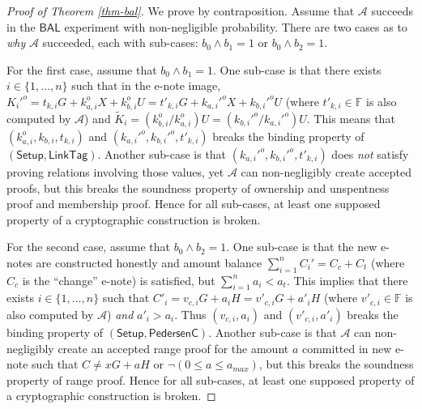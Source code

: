 \documentclass{article}
\begin{document}
\begin{proof}[Proof of Theorem \ref{thm-bal}]
We prove by contraposition. Assume that $\mathcal{A}$ succeeds in the $\textsf{BAL}$ experiment with non-negligible probability. There are two cases as to \textit{why} $\mathcal{A}$ succeeded, each with sub-cases: $b_0 \wedge b_1 = 1$ or $b_0 \wedge b_2 = 1$.

For the first case, assume that $b_0 \wedge b_1 = 1$. One sub-case is that there exists $i\in\{1,\ldots,n\}$ such that in the e-note image, $K_i'^o = t_{k,i} G + k_{a,i}^o X + k_{b,i}^o U = t'_{k,i} G + k_{a,i}'^o X + k_{b,i}'^o U$ (where $t'_{k,i}\in\mathbb{F}$ is also computed by $\mathcal{A}$) and $\tilde{K}_i = (k_{b,i}^o/k_{a,i}^o)U = (k_{b,i}'^o/k_{a,i}'^o)U$. This means that $(k_{a,i}^o, k_{b,i}, t_{k,i})$ and $( k_{a,i}'^o, k_{b,i}'^o, t'_{k,i})$ breaks the binding property of $(\textsf{Setup}, \textsf{LinkTag})$. Another sub-case is that $( k_{a,i}'^o, k_{b,i}'^o, t'_{k,i})$ does \textit{not} satisfy proving relations involving those values, yet $\mathcal{A}$ can non-negligibly create accepted proofs, but this breaks the soundness property of ownership and unspentness proof and membership proof. Hence for all sub-cases, at least one supposed property of a cryptographic construction is broken.

For the second case, assume that $b_0 \wedge b_2 = 1$. One sub-case is that the new e-notes are constructed honestly and amount balance $\sum_{i=1}^n{C_i'}=C_c + C_t$ (where $C_c$ is the ``change'' e-note) is satisfied, but $\sum_{i=1}^n{a_i} < a_t$. This implies that there exists $i\in\{1,\ldots,n\}$ such that $C'_i = v_{c,i} G + a_i H = v'_{c,i} G + a'_i H$ (where $v'_{c,i}\in\mathbb{F}$ is also computed by $\mathcal{A}$) \textit{and} $a'_i > a_i$. Thus $( v_{c,i}, a_i)$ and $(v'_{c,i}, a'_i)$ breaks the binding property of $(\textsf{Setup}, \textsf{PedersenC})$. Another sub-case is that $\mathcal{A}$ can non-negligibly create an accepted range proof for the amount $a$ committed in new e-note such that $C \ne x G + a H$ or $\neg (0 \le a \le a_{max})$, but this breaks the soundness property of range proof. Hence for all sub-cases, at least one supposed property of a cryptographic construction is broken.
\end{proof}
\end{document}
